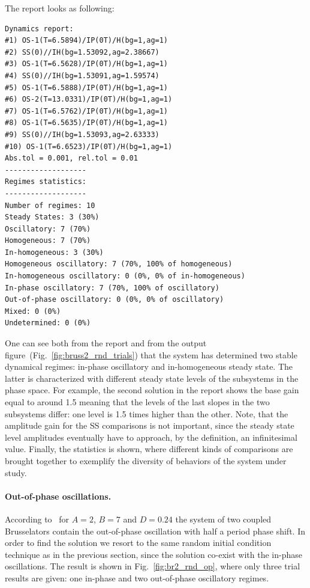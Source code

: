 \documentclass[11pt,a4paper]{article}
\begin{document}
The report looks as following:
\begin{verbatim}
Dynamics report:
#1) OS-1(T=6.5894)/IP(0T)/H(bg=1,ag=1)
#2) SS(0)//IH(bg=1.53092,ag=2.38667)
#3) OS-1(T=6.5628)/IP(0T)/H(bg=1,ag=1)
#4) SS(0)//IH(bg=1.53091,ag=1.59574)
#5) OS-1(T=6.5888)/IP(0T)/H(bg=1,ag=1)
#6) OS-2(T=13.0331)/IP(0T)/H(bg=1,ag=1)
#7) OS-1(T=6.5762)/IP(0T)/H(bg=1,ag=1)
#8) OS-1(T=6.5635)/IP(0T)/H(bg=1,ag=1)
#9) SS(0)//IH(bg=1.53093,ag=2.63333)
#10) OS-1(T=6.6523)/IP(0T)/H(bg=1,ag=1)
Abs.tol = 0.001, rel.tol = 0.01
-------------------
Regimes statistics:
-------------------
Number of regimes: 10
Steady States: 3 (30%)
Oscillatory: 7 (70%)
Homogeneous: 7 (70%)
In-homogeneous: 3 (30%)
Homogeneous oscillatory: 7 (70%, 100% of homogeneous)
In-homogeneous oscillatory: 0 (0%, 0% of in-homogeneous)
In-phase oscillatory: 7 (70%, 100% of oscillatory)
Out-of-phase oscillatory: 0 (0%, 0% of oscillatory)
Mixed: 0 (0%)
Undetermined: 0 (0%)
\end{verbatim}

One can see both from the report and from the output
figure~(Fig.~\ref{fig:bruss2_rnd_trials}) that the system has determined two stable
dynamical regimes: in-phase oscillatory and in-homogeneous steady state. The latter
is characterized with different steady state levels of the subsystems in the phase
space. For example, the second solution in the report shows the base gain equal to
around 1.5 meaning that the levels of the last slopes in the two subsystems differ:
one level is 1.5 times higher than the other. Note, that the amplitude gain for the
SS comparisons is not important, since the steady state level amplitudes eventually
have to approach, by the definition, an infinitesimal value.  Finally, the
statistics is shown, where different kinds of comparisons are brought together to
exemplify the diversity of behaviors of the system under study.

\paragraph{Out-of-phase oscillations.}
\label{sec:out-phase-oscill}

According to~\cite{VolkovBruss2} for $A=2$, $B=7$ and $D=0.24$ the system of two
coupled Brusselators contain the out-of-phase oscillation with half a period phase
shift. In order to find the solution we resort to the same random initial condition
technique as in the previous section, since the solution co-exist with the in-phase
oscillations. The result is shown in Fig.~\ref{fig:br2_rnd_op}, where only three
trial results are given: one in-phase and two out-of-phase oscillatory regimes.
\end{document}
